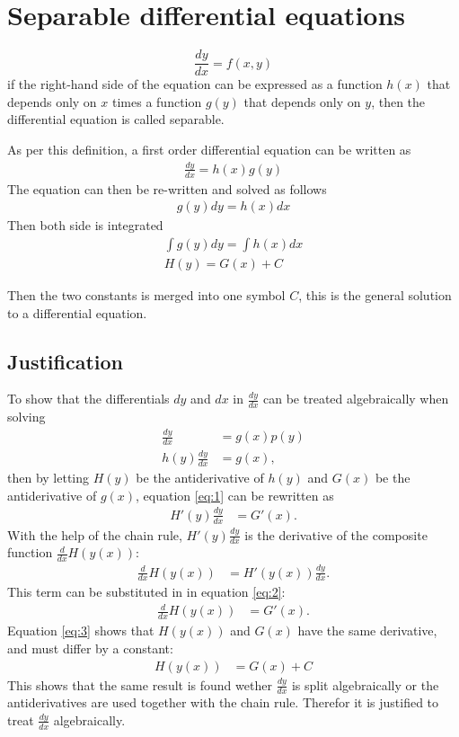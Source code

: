 \section{Separable differential equations} \label{SDE}
\begin{tcolorbox}[colback=blue!5!white,colframe=blue!75!black,title=Definition: Separable equation] 
    $$\frac{dy}{dx} = f(x,y)$$
    if the right-hand side of the equation can be expressed as   a function $h(x)$ that depends only on $x$ times a function $g(y)$ that depends only on $y$, then the differential equation is called separable.
   \end{tcolorbox}
As per this definition, a first order differential equation can be written as
\begin{align}
	\frac{dy}{dx}=h(x)g(y)
\end{align}
The equation can then be re-written and solved as follows
\begin{align}
	g(y)dy=h(x)dx
\end{align}
Then both side is integrated
 \begin{align}
 \int g(y)dy =\int h(x)dx   \\
 H(y)=G(x)+C
 \end{align}
 
Then the two constants is merged into one symbol $C$, this is the general solution to a differential equation. \citep{diffandcomplex}

\subsection{Justification} 
To show that the differentials $dy$ and $dx$ in $\frac{dy}{dx}$ can be treated algebraically when solving 
 \begin{align}
	\frac{dy}{dx} &= g(x)p(y)\nonumber\\
	h(y)\frac{dy}{dx} &= g(x)\label{eq:1},
 \end{align}
then by letting $H(y)$ be the antiderivative of $h(y)$ and $G(x)$ be the antiderivative of $g(x)$, equation \ref{eq:1} can be rewritten as 
 \begin{align}
 	H'(y)\frac{dy}{dx} &= G'(x)\label{eq:2}.
 \end{align}
With the help of the chain rule, $H'(y)\frac{dy}{dx}$ is the derivative of the composite function $\frac{d}{dx}H(y(x))$:
 \begin{align*}
	\frac{d}{dx} H(y(x)) &= H'(y(x))\frac{dy}{dx}.
 \end{align*}
This term can be substituted in in equation \ref{eq:2}:
 \begin{align}
 	\frac{d}{dx}H(y(x)) &= G'(x)\label{eq:3}.
 \end{align}
Equation \ref{eq:3} shows that $H(y(x))$ and $G(x)$ have the same derivative, and must differ by a constant:
 \begin{align*}
 	H(y(x)) &= G(x) + C
 \end{align*}
This shows that the same result is found wether $\frac{dy}{dx}$ is split algebraically or the antiderivatives are used together with the chain rule. Therefor it is justified to treat $\frac{dy}{dx}$ algebraically.

